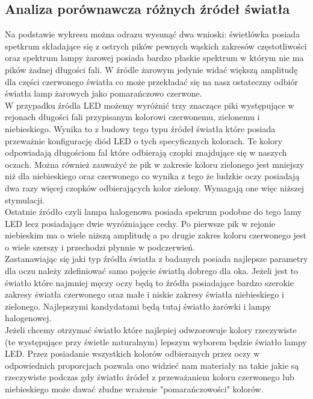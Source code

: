 \documentclass[11pt]{article}
\begin{document}
    \subsection{Analiza porównawcza różnych źródeł światła}
    \noindent{}
    \justifying\indent Na podstawie wykresu można odrazu wysunąć dwa wnioski: świetlówka posiada spetkrum składające się z
    ostrych pików pewnych wąskich zakresów częstotliwości oraz spektrum lampy żarowej posiada bardzo płaskie spektrum
    w którym nie ma pików żadnej długości fali. W źródle żarowym jedynie widać większą amplitudę dla części czerwonego światła
    co może przekładać się na nasz ostateczny odbiór światła lamp żarowych jako pomarańczowo czerwone.\\
    \indent W przypadku źródla LED możemy wyróżnić trzy znaczące piki występujące w rejonach długości fali przypisanym
    kolorowi czerwonemu, zielonemu i niebieskiego. Wynika to z budowy tego typu źródeł światła które posiada przeważnie
    konfigurację diód LED o tych specyficznych kolorach. Te kolory odpowiadają długościom fal które odbierają
    czopki znajdujące się w naszych oczach. Można również zauważyć że pik w zakresie koloru zielonego jest mniejszy
    niż dla niebieskiego oraz czerwonego co wynika z tego że ludzkie oczy posiadają dwa razy więcej czopków odbierających
    kolor zielony. Wymagają one więc niższej stymulacji.\\
    \indent Ostatnie źródło czyli lampa halogenowa posiada spekrum podobne do tego lamy LED lecz posiadające dwie
    wyróżniające cechy. Po pierwsze pik w rejonie niebieskim ma o wiele niższą amplitudę a po drugie zakres koloru czerwonego
    jest o wiele szerszy i przechodzi płynnie w podczerwień.\\
    \indent Zastanawiając się jaki typ źródła światła z badanych posiada najlepsze parametry dla oczu należy zdefiniować
    samo pojęcie światłą dobrego dla oka. Jeżeli jest to światło które najmniej męczy oczy będą to źródła posiadające bardzo
    szerokie zakresy światła czerwonego oraz małe i niskie zakresy światła niebieskiego i zielonego. Najlepszymi kandydatami
    będą tutaj światło żarówki i lampy halogenowej.\\
    \indent Jeżeli chcemy otrzymać światło które najlepiej odwzorowuje kolory rzeczywiste (te występujące przy świetle naturalnym)
    lepszym wyborem będzie światło lampy LED. Przez posiadanie wszystkich kolorów odbieranych przez oczy w odpowiednich proporcjach
    pozwala ono widzieć nam materiały na takie jakie są rzeczywiste podczas gdy światło źródeł z przeważaniem koloru czerwonego lub
    niebieskiego może dawać złudne wrażenie "pomarańczowości" kolorów.
\end{document}
